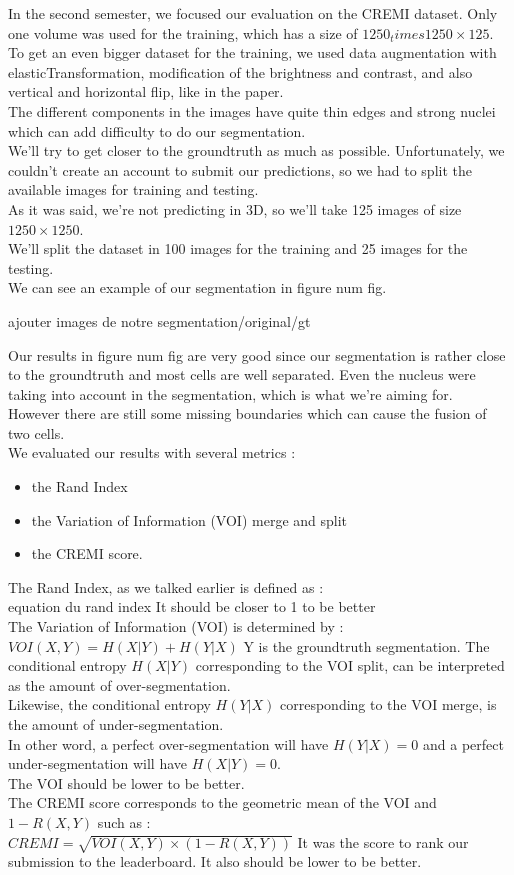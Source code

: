 In the second semester, we focused our evaluation on the CREMI dataset. Only one volume was used for the training, which has a size of $1250_times 1250\times 125$.\\
To get an even bigger dataset for the training, we used data augmentation with elasticTransformation, modification of the brightness and contrast, and also vertical and horizontal flip, like in the paper.\\
The different components in the images have quite thin edges and strong nuclei which can add difficulty to do our segmentation.\\
We’ll try to get closer to the groundtruth as much as possible. Unfortunately, we couldn’t create an account to submit our predictions, so we had to split the available images for training and testing.\\ 
As it was said, we’re not predicting in 3D, so we’ll take 125 images of size $1250\times 1250$.\\ 
We’ll split the dataset in 100 images for the training and 25 images for the testing.\\
We can see an example of our segmentation in figure {\color{red} num fig}.

{\color{red} ajouter images de notre segmentation/original/gt}

Our results in figure {\color{red} num fig} are very good since our segmentation is rather close to the groundtruth and most cells are well separated.
Even the nucleus were taking into account in the segmentation, which is what we're aiming for.\\
However there are still some missing boundaries which can cause the fusion of two cells.\\

We evaluated our results with several metrics :\\
\begin{itemize}
  \item the Rand Index
  \item the Variation of Information (VOI) merge and split
  \item the CREMI score.
\end{itemize}

The Rand Index, as we talked earlier is defined as :\\
{\color{red} equation du rand index}
It should be closer to 1 to be better\\

The Variation of Information (VOI) is determined by :\\
$VOI(X,Y) = H(X|Y) + H(Y|X)$
Y is the groundtruth segmentation.
The conditional entropy $H(X|Y)$ corresponding to the VOI split, can be interpreted as the amount of over-segmentation.\\
Likewise, the conditional entropy $H(Y|X)$ corresponding to the VOI merge, is the amount of under-segmentation.\\
In other word, a perfect over-segmentation will have $H(Y|X) = 0$ and a perfect under-segmentation will have $H(X|Y) = 0$.\\
The VOI should be lower to be better.\\

The CREMI score corresponds to the geometric mean of the VOI and $1-R(X,Y)$ such as :\\
$CREMI = \sqrt{VOI(X,Y)\times (1 - R(X,Y))}$
It was the score to rank our submission to the leaderboard. It also should be lower to be better.\\



